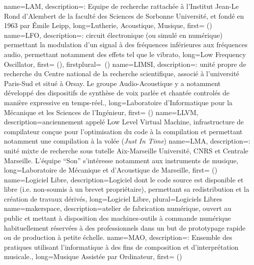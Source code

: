 {
    name={LAM},
    description={\textit{}: Equipe de recherche rattachée à l'Institut Jean-Le Rond d'Alembert de la faculté des Sciences de Sorbonne Université, et fondé en 1963 par Émile Leipp},
    long={Lutherie, Acoustique, Musique},
    first={ ()}
}
{
    name={LFO},
    description={\textit{}: circuit électronique (ou simulé en numérique) permettant la modulation d'un signal à des fréquences inférieures aux fréquences audio, permettant notamment des effets tel que le vibrato},
    long={Low Frequency Oscillator},
    first={ ()},
    firstplural={\glspluralsuffix\ (\glspluralsuffix)}
}
{
    name={LIMSI},
    description={\textit{}: unité propre de recherche du Centre national de la recherche scientifique, associé à l'université Paris-Sud et situé à Orsay. Le groupe Audio-Acoustique y a notamment développé des dispositifs de synthèse de voix parlée et chantée controlés de manière expressive en temps-réel.},
    long={Laboratoire d'Informatique pour la Mécanique et les Sciences de l'Ingénieur},
    first={ ()}
}
{
    name={LLVM},
    description={anciennement appelé Low Level Virtual Machine, infrastructure de compilateur conçue pour l'optimisation du code à la compilation et permettant notamment une compilation à la volée (\textit{Just In Time})}
}
{
    name={LMA},
    description={\textit{}: unité mixte de recherche sous tutelle Aix-Marseille Université, CNRS et Centrale Marseille. L'équipe ``Son'' s'intéresse notamment aux instruments de musique},
    long={Laboratoire de Mécanique et d'Acoustique de Marseille},
    first={ ()}
}
{
    name={Logiciel Libre},
    description={Logiciel dont le code source est disponible et libre (i.e. non-soumis à un brevet propriétaire), permettant sa redistribution et la création de travaux dérivés},
    long={Logiciel Libre},
    plural={Logiciels Libres}
}
{
    name={makerspace},
    description={atelier de fabrication numérique, ouvert au public et mettant à disposition des machines-outils à commande numérique habituellement réservées à des professionnels dans un but de prototypage rapide ou de production à petite échelle.}
}
{
    name={MAO},
    description={\textit{}: Ensemble des pratiques utilisant l'informatique à des fins de composition et d'interprétation musicale.},
    long={Musique Assistée par Ordinateur},
    first={ ()}
}
